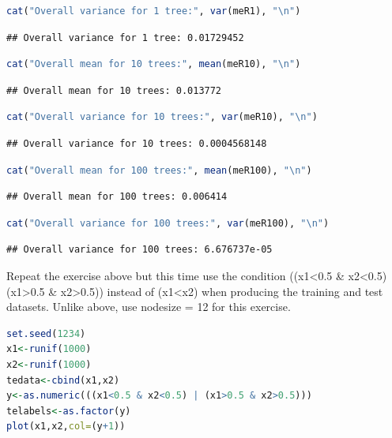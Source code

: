 \documentclass[
]{article}
\begin{document}
\begin{lstlisting}[language=R]
cat("Overall variance for 1 tree:", var(meR1), "\n")
\end{lstlisting}

\begin{lstlisting}
## Overall variance for 1 tree: 0.01729452
\end{lstlisting}

\begin{lstlisting}[language=R]
cat("Overall mean for 10 trees:", mean(meR10), "\n")
\end{lstlisting}

\begin{lstlisting}
## Overall mean for 10 trees: 0.013772
\end{lstlisting}

\begin{lstlisting}[language=R]
cat("Overall variance for 10 trees:", var(meR10), "\n")
\end{lstlisting}

\begin{lstlisting}
## Overall variance for 10 trees: 0.0004568148
\end{lstlisting}

\begin{lstlisting}[language=R]
cat("Overall mean for 100 trees:", mean(meR100), "\n")
\end{lstlisting}

\begin{lstlisting}
## Overall mean for 100 trees: 0.006414
\end{lstlisting}

\begin{lstlisting}[language=R]
cat("Overall variance for 100 trees:", var(meR100), "\n")
\end{lstlisting}

\begin{lstlisting}
## Overall variance for 100 trees: 6.676737e-05
\end{lstlisting}

Repeat the exercise above but this time use the condition
((x1\textless0.5 \& x2\textless0.5) \textbar{} (x1\textgreater0.5 \&
x2\textgreater0.5)) instead of (x1\textless x2) when producing the
training and test datasets. Unlike above, use nodesize = 12 for this
exercise.

\begin{lstlisting}[language=R]
set.seed(1234)
x1<-runif(1000)
x2<-runif(1000)
tedata<-cbind(x1,x2)
y<-as.numeric(((x1<0.5 & x2<0.5) | (x1>0.5 & x2>0.5)))
telabels<-as.factor(y)
plot(x1,x2,col=(y+1))
\end{lstlisting}
\end{document}
